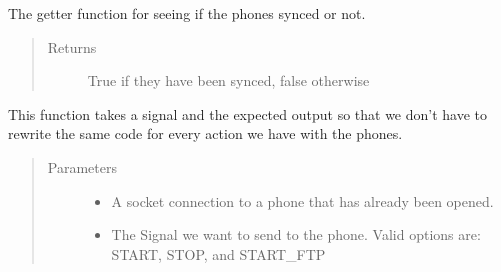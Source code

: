\documentclass[letterpaper,10pt,english]{sphinxmanual}
\begin{document}
\begin{fulllineitems}
\begin{fulllineitems}
\begin{quote}
\begin{description}
\end{description}\end{quote}

\end{fulllineitems}


\begin{fulllineitems}
\label{\detokenize{index:src.Controllers.PhoneController.PhoneControl.synced}}
The getter function for seeing if the phones synced or not.
\begin{quote}\begin{description}
\item[{Returns}] \leavevmode
True if they have been synced, false otherwise

\end{description}\end{quote}

\end{fulllineitems}


\begin{fulllineitems}
\label{\detokenize{index:src.Controllers.PhoneController.PhoneControl.threadSendSignal}}
This function takes a signal and the expected output so that we don’t have to rewrite the same code for
every action we have with the phones.
\begin{quote}\begin{description}
\item[{Parameters}] \leavevmode\begin{itemize}
\item {} 
 \textendash{} A socket connection to a phone that has already been opened.

\item {} 
 \textendash{} The Signal we want to send to the phone. Valid options are: START, STOP, and START\_FTP


\end{itemize}
\end{description}
\end{quote}
\end{fulllineitems}
\end{fulllineitems}
\end{document}
